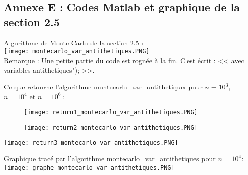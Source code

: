 \documentclass{article}
\theoremstyle{exostyle}
\begin{document}
\begin{appendices}

\setcounter{page}{1}
\section{Annexe E : Codes Matlab et graphique de la section 2.5}

\bigbreak
\bigbreak

\hspace{-2.4cm}\underline{Algorithme de Monte Carlo de la section 2.5 :}\\

\hspace{-2.5cm}\texttt{[image: montecarlo\_var\_antithetiques.PNG]}\\

\hspace{-2.4cm}\underline{Remarque :} Une petite partie du code est rognée à la fin. C'est écrit : << avec variables antithetiques"); >>.

\newpage

\underline{Ce que retourne l'algorithme montecarlo\_var\_antithetiques pour $n = 10^{3}$, $n = 10^{4}$ et $n = 10^{6}$ :}

\begin{figure}[h]
    \begin{minipage}[c]{.46\linewidth}
        \centering
        \texttt{[image: return1\_montecarlo\_var\_antithetiques.PNG]}
    \end{minipage}
    \hfill
    \begin{minipage}[c]{.46\linewidth}
        \centering
        \texttt{[image: return2\_montecarlo\_var\_antithetiques.PNG]}
    \end{minipage}
\end{figure}


\texttt{[image: return3\_montecarlo\_var\_antithetiques.PNG]}

\newpage

\hspace{-1.7cm}\underline{Graphique tracé par l'algorithme montecarlo\_var\_antithetiques pour $n=10^{4}$:}\\

\hspace{-1.7cm}\texttt{[image: graphe\_montecarlo\_var\_antithetiques.PNG]}

\end{appendices}
\end{document}
